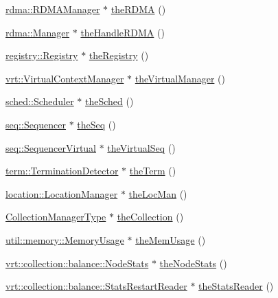 \begin{DoxyCompactItemize}
\hyperlink{structvt_1_1rdma_1_1_r_d_m_a_manager}{rdma\+::\+R\+D\+M\+A\+Manager} $\ast$ \hyperlink{namespacevt_a68b8410bc2b86d3b5228d7dbb6b40bac}{the\+R\+D\+MA} ()
\item 
\hyperlink{structvt_1_1rdma_1_1_manager}{rdma\+::\+Manager} $\ast$ \hyperlink{namespacevt_aecb87ec2c40b5b7fc57ba4cf8ea838b0}{the\+Handle\+R\+D\+MA} ()
\item 
\hyperlink{structvt_1_1registry_1_1_registry}{registry\+::\+Registry} $\ast$ \hyperlink{namespacevt_a8b5994a5aedabc64006ce820db2e938c}{the\+Registry} ()
\item 
\hyperlink{structvt_1_1vrt_1_1_virtual_context_manager}{vrt\+::\+Virtual\+Context\+Manager} $\ast$ \hyperlink{namespacevt_ad46b232b74b745991314a4a509c648f9}{the\+Virtual\+Manager} ()
\item 
\hyperlink{structvt_1_1sched_1_1_scheduler}{sched\+::\+Scheduler} $\ast$ \hyperlink{namespacevt_a4508b38e6ab664b64f1415aecbb83571}{the\+Sched} ()
\item 
\hyperlink{structvt_1_1seq_1_1_sequencer}{seq\+::\+Sequencer} $\ast$ \hyperlink{namespacevt_a4a7d07c845b311da59286de486d623c7}{the\+Seq} ()
\item 
\hyperlink{structvt_1_1seq_1_1_sequencer_virtual}{seq\+::\+Sequencer\+Virtual} $\ast$ \hyperlink{namespacevt_abdbb9ddb0d79b35c89e9d742d3fc9d42}{the\+Virtual\+Seq} ()
\item 
\hyperlink{structvt_1_1term_1_1_termination_detector}{term\+::\+Termination\+Detector} $\ast$ \hyperlink{namespacevt_a127580fdfcaba0b4171e5c48c5676733}{the\+Term} ()
\item 
\hyperlink{structvt_1_1location_1_1_location_manager}{location\+::\+Location\+Manager} $\ast$ \hyperlink{namespacevt_ace1c9d64e09732e3b7414d02517ecfdb}{the\+Loc\+Man} ()
\item 
\hyperlink{namespacevt_a290f7e8941f9f411b54cdb15b6cea107}{Collection\+Manager\+Type} $\ast$ \hyperlink{namespacevt_a1c45ce63bfd2c327ff7d76a319a371d8}{the\+Collection} ()
\item 
\hyperlink{structvt_1_1util_1_1memory_1_1_memory_usage}{util\+::memory\+::\+Memory\+Usage} $\ast$ \hyperlink{namespacevt_a38d485d3cf840b9a623e47e7754ef72e}{the\+Mem\+Usage} ()
\item 
\hyperlink{structvt_1_1vrt_1_1collection_1_1balance_1_1_node_stats}{vrt\+::collection\+::balance\+::\+Node\+Stats} $\ast$ \hyperlink{namespacevt_ae1526efa346612ad330d9a628e596c54}{the\+Node\+Stats} ()
\item 
\hyperlink{structvt_1_1vrt_1_1collection_1_1balance_1_1_stats_restart_reader}{vrt\+::collection\+::balance\+::\+Stats\+Restart\+Reader} $\ast$ \hyperlink{namespacevt_ad73860100c7d2ca1d833eab74942ee73}{the\+Stats\+Reader} ()

\end{DoxyCompactItemize}
